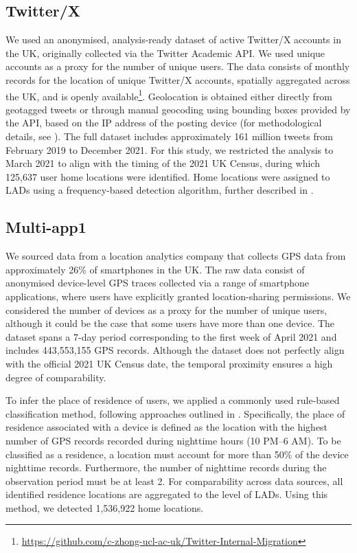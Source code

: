 \documentclass[]{rsos}%
\begin{document}
\subsection{Twitter/X}\label{twitterx}

We used an anonymised, analysis-ready dataset of active Twitter/X
accounts in the UK, originally collected via the Twitter Academic API.
We used unique accounts as a proxy for the number of unique users. The
data consists of monthly records for the location of unique Twitter/X
accounts, spatially aggregated across the UK, and is openly available\footnote{\url{https://github.com/c-zhong-ucl-ac-uk/Twitter-Internal-Migration}}.
Geolocation is obtained either directly from geotagged tweets or through
manual geocoding using bounding boxes provided by the API, based on the
IP address of the posting device (for methodological details, see
\citep{wang2022}). The full dataset includes approximately 161 million tweets
from February 2019 to December 2021. For this study, we restricted the
analysis to March 2021 to align with the timing of the 2021 UK Census,
during which 125,637 user home locations were identified. Home locations
were assigned to LADs using a frequency-based detection algorithm,
further described in \citep{wang2022}.

\subsection{Multi-app1}\label{multi-app1}

We sourced data from a location analytics company that collects GPS data
from approximately 26\% of smartphones in the UK. The raw data consist of
anonymised device-level GPS traces collected via a range of smartphone
applications, where users have explicitly granted location-sharing
permissions. We considered the number of devices as a proxy for the
number of unique users, although it could be the case that some users
have more than one device. The dataset spans a 7-day period
corresponding to the first week of April 2021 and includes 443,553,155
GPS records. Although the dataset does not perfectly align with the
official 2021 UK Census date, the temporal proximity ensures a high
degree of comparability.

To infer the place of residence of users, we applied a commonly used
rule-based classification method, following approaches outlined in
\citep{zhong24working, unstatsMPDMS2025}. Specifically, the place of
residence associated with a device is defined as the location with the
highest number of GPS records recorded during nighttime hours (10 PM--6
AM). To be classified as a residence, a location must account for more
than 50\% of the device nighttime records. Furthermore, the number of
nighttime records during the observation period must be at least 2. For
comparability across data sources, all identified residence locations
are aggregated to the level of LADs. Using this method, we detected
1,536,922 home locations.
\end{document}
